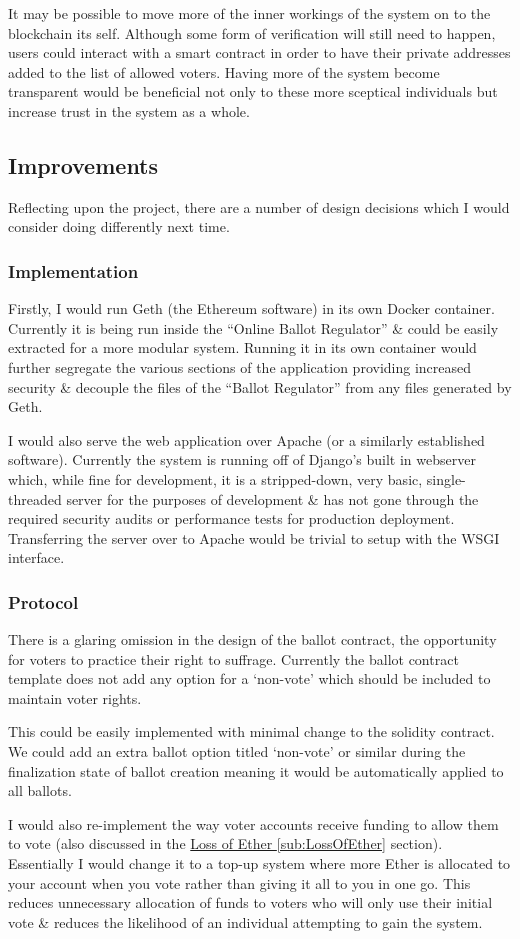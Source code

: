 \documentclass{article}
\begin{document}
	It may be possible to move more of the inner workings of the system on to the blockchain its self. Although some form of verification will still need to happen, users could interact with a smart contract in order to have their private addresses added to the list of allowed voters. Having more of the system become transparent would be beneficial not only to these more sceptical individuals but increase trust in the system as a whole.
    
\cleardoublepage
\subsection{Improvements}
Reflecting upon the project, there are a number of design decisions which I would consider doing differently next time.

\subsubsection{Implementation}
Firstly, I would run Geth (the Ethereum software) in its own Docker container. Currently it is being run inside the ``Online Ballot Regulator'' \& could be easily extracted for a more modular system. Running it in its own container would further segregate the various sections of the application providing increased security \& decouple the files of the ``Ballot Regulator'' from any files generated by Geth.

I would also serve the web application over Apache (or a similarly established software). Currently the system is running off of Django's built in webserver which, while fine for development, it is a stripped-down, very basic, single-threaded server for the purposes of development \& has not gone through the required security audits or performance tests for production deployment. Transferring the server over to Apache would be trivial to setup with the WSGI interface.

\subsubsection{Protocol}
There is a glaring omission in the design of the ballot contract, the opportunity for voters to practice their right to suffrage. Currently the ballot contract template does not add any option for a `non-vote' which should be included to maintain voter rights.

This could be easily implemented with minimal change to the solidity contract. We could add an extra ballot option titled `non-vote' or similar during the finalization state of ballot creation meaning it would be automatically applied to all ballots.

I would also re-implement the way voter accounts receive funding to allow them to vote (also discussed in the \hyperref[sub:LossOfEther]{Loss of Ether \ref*{sub:LossOfEther}} section). Essentially I would change it to a top-up system where more Ether is allocated to your account when you vote rather than giving it all to you in one go. This reduces unnecessary allocation of funds to voters who will only use their initial vote \& reduces the likelihood of an individual attempting to gain the system.
\end{document}
